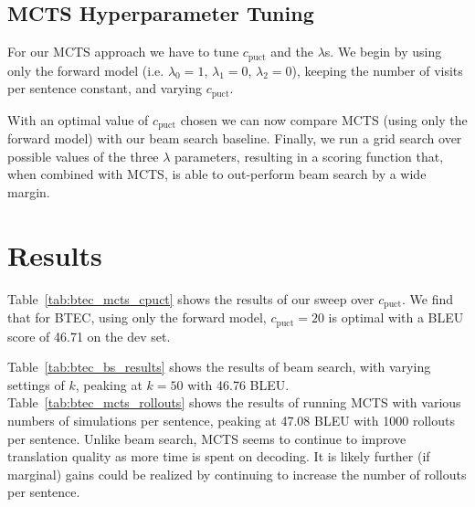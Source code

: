 \documentclass[11pt,a4paper]{article}
\begin{document}
\subsection{MCTS Hyperparameter Tuning}
For our MCTS approach we have to tune $c_\text{puct}$ and the $\lambda$s. We
begin by using only the forward model (i.e. $\lambda_0=1$, $\lambda_1=0$,
$\lambda_2=0$), keeping the number of visits per sentence constant, and varying
$c_\text{puct}$.

With an optimal value of $c_\text{puct}$ chosen we can now compare MCTS (using
only the forward model) with our beam search baseline. Finally, we run a grid
search over possible values of the three $\lambda$ parameters, resulting in
a scoring function that, when combined with MCTS, is able to out-perform
beam search by a wide margin.

\section{Results}
\label{sec:results}
Table~\ref{tab:btec_mcts_cpuct} shows the results of our sweep over
$c_\text{puct}$. We find that for BTEC, using only the forward model,
$c_\text{puct}=20$ is optimal with a BLEU score of 46.71 on the dev set.

Table~\ref{tab:btec_bs_results} shows the results of beam search, with varying
settings of $k$, peaking at $k=50$ with 46.76 BLEU.
Table~\ref{tab:btec_mcts_rollouts} shows the results of running MCTS with
various numbers of simulations per sentence, peaking at 47.08 BLEU with 1000
rollouts per sentence. Unlike beam search, MCTS seems to continue to improve
translation quality as more time is spent on decoding. It is likely further (if
marginal) gains could be realized by continuing to increase the number of
rollouts per sentence.
\end{document}
